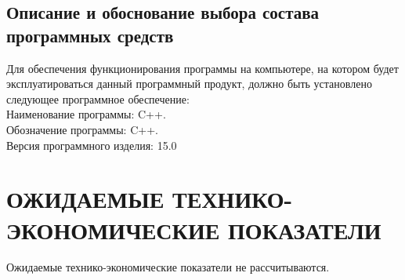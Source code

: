 \documentclass[14pt,a4paper,final]{extreport}
\begin{document}
\section{Описание и обоснование выбора состава программных средств}

Для обеспечения функционирования программы на компьютере, на котором будет эксплуатироваться данный программный продукт, должно быть установлено следующее программное обеспечение:
\\
Наименование программы: C++.
\\
Обозначение программы: C++.
\\
Версия программного изделия: 15.0

\chapter{ОЖИДАЕМЫЕ ТЕХНИКО-ЭКОНОМИЧЕСКИЕ ПОКАЗАТЕЛИ}
Ожидаемые технико-экономические показатели не рассчитываются.

\pagebreak

\label{lastpage}

\end{document}
